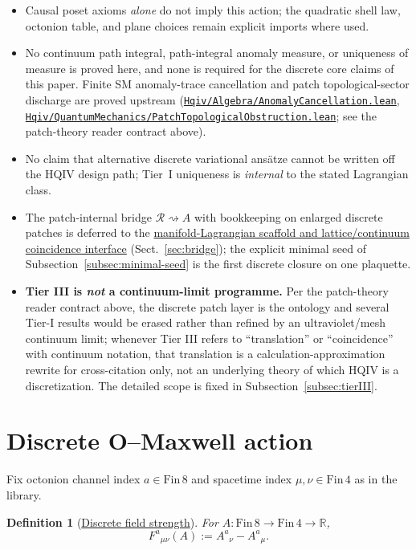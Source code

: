 \documentclass[11pt]{amsart}
\newcommand{\leanrepo}{https://github.com/HQIV/hqiv-lean/blob/main}
\newcommand{\leanfile}[1]{\href{\leanrepo/#1}{\nolinkurl{#1}}}
\newtheorem{definition}[theorem]{Definition}
\begin{document}
\begin{itemize}
\item Causal poset axioms \emph{alone} do not imply this action; the quadratic shell law, octonion table, and plane choices remain explicit imports where used.
\item No continuum path integral, path-integral anomaly measure, or uniqueness of measure is proved here, and none is required for the discrete core claims of this paper. Finite SM anomaly-trace cancellation and patch topological-sector discharge are proved upstream (\leanfile{Hqiv/Algebra/AnomalyCancellation.lean}, \leanfile{Hqiv/QuantumMechanics/PatchTopologicalObstruction.lean}; see the patch-theory reader contract above).
\item No claim that alternative discrete variational ans\"atze cannot be written off the HQIV design path; Tier~I uniqueness is \emph{internal} to the stated Lagrangian class.
\item The patch-internal bridge \(\mathcal{R}\rightsquigarrow A\) with bookkeeping on enlarged discrete patches is deferred to the \hyperref[lean:scaffold-bridge]{manifold-Lagrangian scaffold and lattice/continuum coincidence interface} (Sect.~\ref{sec:bridge}); the explicit minimal seed of Subsection~\ref{subsec:minimal-seed} is the first discrete closure on one plaquette.
\item \textbf{Tier III is \emph{not} a continuum-limit programme.} Per the patch-theory reader contract above, the discrete patch layer is the ontology and several Tier-I results would be erased rather than refined by an ultraviolet/mesh continuum limit; whenever Tier III refers to ``translation'' or ``coincidence'' with continuum notation, that translation is a calculation-approximation rewrite for cross-citation only, not an underlying theory of which HQIV is a discretization. The detailed scope is fixed in Subsection~\ref{subsec:tierIII}.
\end{itemize}

\section{Discrete O--Maxwell action}
\label{sec:discrete}

Fix octonion channel index \(a\in \mathrm{Fin}\,8\) and spacetime index \(\mu,\nu\in \mathrm{Fin}\,4\) as in the library.

\begin{definition}[\texorpdfstring{\hyperref[lean:F-from-A]{Discrete field strength}}{Discrete field strength}]
\label{def:F}
For \(A : \mathrm{Fin}\,8 \to \mathrm{Fin}\,4 \to \mathbb{R}\),
\[
F^a{}_{\mu\nu}(A) := A^a{}_\nu - A^a{}_\mu .
\]
\end{definition}
\end{document}

